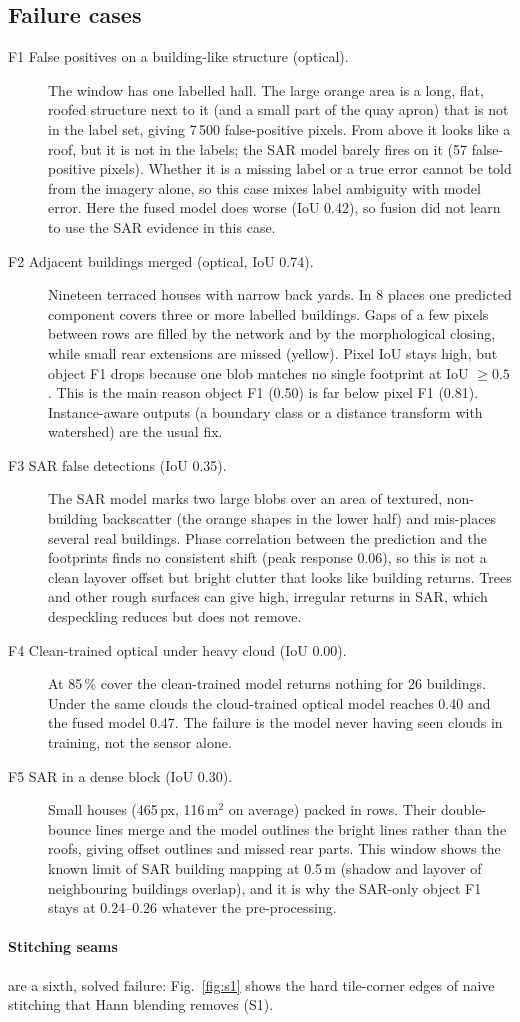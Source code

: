 \subsection*{Failure cases}
\begin{description}
\item[F1 False positives on a building-like structure (optical).] The window has one
labelled hall. The large orange area is a long, flat, roofed structure next to it (and a
small part of the quay apron) that is not in the label set, giving 7\,500 false-positive
pixels. From above it looks like a roof, but it is not in the labels; the SAR model
barely fires on it (57 false-positive pixels). Whether it is a missing label or a true
error cannot be told from the imagery alone, so this case mixes label ambiguity with model
error. Here the fused model does worse (IoU 0.42), so fusion did not learn to use the SAR
evidence in this case.
\item[F2 Adjacent buildings merged (optical, IoU 0.74).] Nineteen terraced houses with
narrow back yards. In 8 places one predicted component covers three or more labelled
buildings. Gaps of a few pixels between rows are filled by the network and by the
morphological closing, while small rear extensions are missed (yellow). Pixel IoU stays
high, but object F1 drops because one blob matches no single footprint at IoU $\ge 0.5$.
This is the main reason object F1 (0.50) is far below pixel F1 (0.81). Instance-aware
outputs (a boundary class or a distance transform with watershed) are the usual fix.
\item[F3 SAR false detections (IoU 0.35).] The SAR model marks two large blobs over an area
of textured, non-building backscatter (the orange shapes in the lower half) and
mis-places several real buildings. Phase correlation between the prediction and the
footprints finds no consistent shift (peak response 0.06), so this is not a clean layover
offset but bright clutter that looks like building returns. Trees and other rough
surfaces can give high, irregular returns in SAR, which despeckling reduces but does not
remove.
\item[F4 Clean-trained optical under heavy cloud (IoU 0.00).] At 85\,\% cover the
clean-trained model returns nothing for 26 buildings. Under the same clouds the
cloud-trained optical model reaches 0.40 and the fused model 0.47. The failure is the
model never having seen clouds in training, not the sensor alone.
\item[F5 SAR in a dense block (IoU 0.30).] Small houses (465\,px, 116\,m$^2$ on average)
packed in rows. Their double-bounce lines merge and the model outlines the bright lines
rather than the roofs, giving offset outlines and missed rear parts. This window shows the
known limit of SAR building mapping at 0.5\,m (shadow and layover of neighbouring
buildings overlap), and it is why the SAR-only object F1 stays at 0.24--0.26 whatever the
pre-processing.
\end{description}

\paragraph{Stitching seams} are a sixth, solved failure: Fig.~\ref{fig:s1} shows the hard
tile-corner edges of naive stitching that Hann blending removes (S1).
